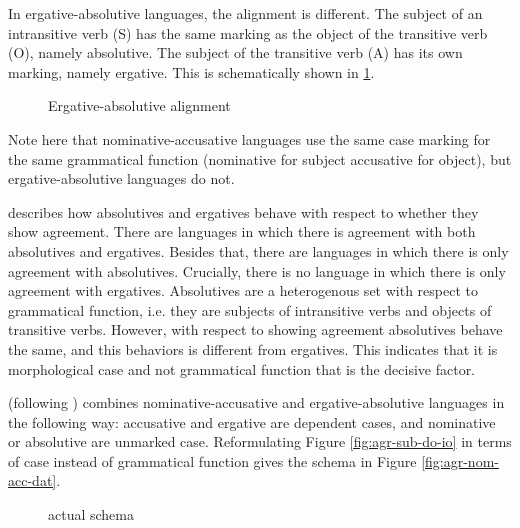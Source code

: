 In ergative-absolutive languages, the alignment is different. The subject of an intransitive verb (S) has the same marking as the object of the transitive verb (O), namely absolutive. The subject of the transitive verb (A) has its own marking, namely ergative. This is schematically shown in \ref{fig:erg-abs-lang}.

\begin{figure}[ht]
  \centering
  \caption{Ergative-absolutive alignment}
  \label{fig:erg-abs-lang}
\end{figure}

Note here that nominative-accusative languages use the same case marking for the same grammatical function (nominative for subject accusative for object), but ergative-absolutive languages do not.

\citet{bobaljik2006} describes how absolutives and ergatives behave with respect to whether they show agreement. There are languages in which there is agreement with both absolutives and ergatives. Besides that, there are languages in which there is only agreement with absolutives. Crucially, there is no language in which there is only agreement with ergatives. Absolutives are a heterogenous set with respect to grammatical function, i.e. they are subjects of intransitive verbs and objects of transitive verbs. However, with respect to showing agreement absolutives behave the same, and this behaviors is different from ergatives. This indicates that it is morphological case and not grammatical function that is the decisive factor.

\citeauthor{bobaljik2006} (following \citealt{marantz2000}) combines nominative-accusative and ergative-absolutive languages in the following way: accusative and ergative are dependent cases, and nominative or absolutive are unmarked case. Reformulating Figure \ref{fig:agr-sub-do-io} in terms of case instead of grammatical function gives the schema in Figure \ref{fig:agr-nom-acc-dat}.

\begin{figure}[H]
  \centering
  \caption{ actual schema}
  \label{fig:agr-def-dep-dat}
\end{figure}

